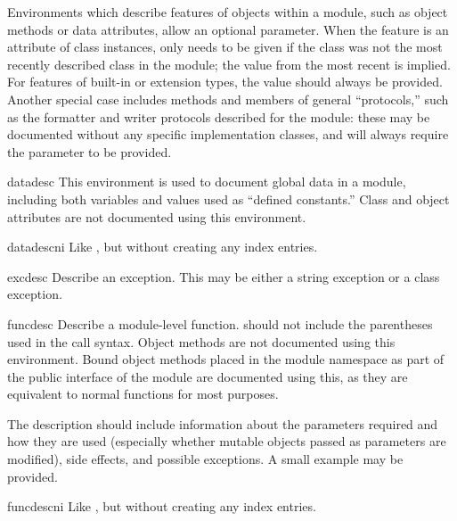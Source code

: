 \documentclass{howto}
\begin{document}
    Environments which describe features of objects within a module,
    such as object methods or data attributes, allow an optional
     parameter.  When the feature is an attribute of
    class instances,  only needs to be given if the
    class was not the most recently described class in the module; the
     value from the most recent  is implied.
    For features of built-in or extension types, the 
    value should always be provided.  Another special case includes
    methods and members of general ``protocols,'' such as the
    formatter and writer protocols described for the
     module: these may be documented without any
    specific implementation classes, and will always require the
     parameter to be provided.

    \begin{envdesc}{datadesc}{}
      This environment is used to document global data in a module,
      including both variables and values used as ``defined
      constants.''  Class and object attributes are not documented
      using this environment.
    \end{envdesc}
    \begin{envdesc}{datadescni}{}
      Like , but without creating any index entries.
    \end{envdesc}

    \begin{envdesc}{excdesc}{}
      Describe an exception.  This may be either a string exception or
      a class exception.
    \end{envdesc}

    \begin{envdesc}{funcdesc}{}
      Describe a module-level function.   should
      not include the parentheses used in the call syntax.  Object
      methods are not documented using this environment.  Bound object
      methods placed in the module namespace as part of the public
      interface of the module are documented using this, as they are
      equivalent to normal functions for most purposes.

      The description should include information about the parameters
      required and how they are used (especially whether mutable
      objects passed as parameters are modified), side effects, and
      possible exceptions.  A small example may be provided.
    \end{envdesc}
    \begin{envdesc}{funcdescni}{}
      Like , but without creating any index entries.
    \end{envdesc}
\end{document}
